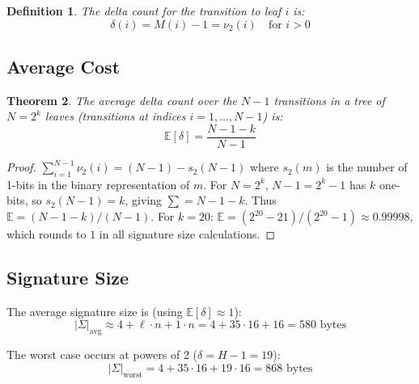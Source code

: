 \documentclass[11pt]{article}
\newtheorem{theorem}{Theorem}
\newtheorem{definition}[theorem]{Definition}
\begin{document}
\begin{definition}
The \emph{delta count} for the transition to leaf $i$ is:
\[
\delta(i) = M(i) - 1 = \nu_2(i) \quad \text{for } i > 0
\]
\end{definition}

\subsection{Average Cost}

\begin{theorem}\label{thm:avg-delta}
The average delta count over the $N - 1$ transitions in a tree of
$N = 2^k$ leaves (transitions at indices $i = 1, \ldots, N - 1$) is:
\[
\mathbb{E}[\delta] = \frac{N - 1 - k}{N - 1}
\]
\end{theorem}

\begin{proof}
$\sum_{i=1}^{N-1} \nu_2(i) = (N - 1) - s_2(N - 1)$ where $s_2(m)$
is the number of 1-bits in the binary representation of $m$. For
$N = 2^k$, $N - 1 = 2^k - 1$ has $k$ one-bits, so $s_2(N-1) = k$,
giving $\sum = N - 1 - k$. Thus
$\mathbb{E} = (N - 1 - k) / (N - 1)$.
For $k = 20$: $\mathbb{E} = (2^{20} - 21) / (2^{20} - 1) \approx
0.99998$, which rounds to $1$ in all signature size calculations.
\end{proof}

\subsection{Signature Size}

The average signature size is (using $\mathbb{E}[\delta] \approx 1$):
\[
|\Sigma|_{\text{avg}} \approx 4 + \ell \cdot n + 1 \cdot n
= 4 + 35 \cdot 16 + 16 = 580 \text{ bytes}
\]

The worst case occurs at powers of 2 ($\delta = H - 1 = 19$):
\[
|\Sigma|_{\text{worst}} = 4 + 35 \cdot 16 + 19 \cdot 16 = 868 \text{ bytes}
\]
\end{document}
